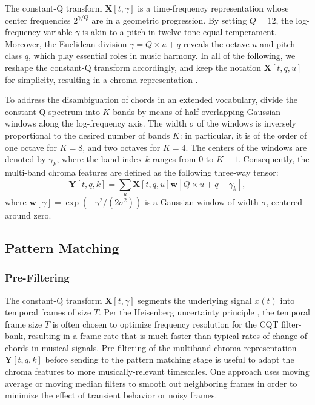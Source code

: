 The constant-Q transform $\mathbf{X}[t, \gamma]$ is a time-frequency
representation whose center frequencies $2^{\gamma/Q}$ are in a geometric progression.
By setting $Q=12$, the log-frequency variable $\gamma$ is akin to a pitch in twelve-tone
equal temperament.
Moreover, the Euclidean division $\gamma = Q \times u + q$
reveals the octave $u$ and pitch class $q$,
which play essential roles in music harmony.
In all of the following, we reshape the constant-Q transform
accordingly, and keep the notation $\mathbf{X}[t, q, u]$ for simplicity, resulting in a chroma representation \cite{cho2014on}.

To address the disambiguation of chords in an extended vocabulary,
\cite{cho2013mirex} divide the constant-Q spectrum into $K$
bands by means of half-overlapping Gaussian windows along
the log-frequency axis.
The width $\sigma$ of the windows is inversely proportional
to the desired number of bands $K$:
in particular, it is of the order of one octave for $K=8$,
and two octaves for $K=4$.
The centers of the windows are denoted by $\gamma_k$, where
the band index $k$ ranges from $0$ to $K-1$.
Consequently, the multi-band chroma features are defined as the following
three-way tensor:
\begin{equation}
\mathbf{Y}[t, q, k]
=
\sum_{u} 
\mathbf{X}[t, q, u]
\boldsymbol{w}[Q \times u + q - \gamma_k],
\end{equation}
where
$\boldsymbol{w}[\gamma] = \exp( - \gamma^2 / (2\sigma^2))$
is a Gaussian window of width $\sigma$, centered around zero.
 
 \subsection{Pattern Matching}
 \label{sec:GMM}
 
 \subsubsection{Pre-Filtering}
 
The constant-Q transform $\mathbf{X}[t,\gamma]$ segments the underlying signal $x(t)$ into temporal frames of size $T$. Per the Heisenberg uncertainty principle \cite{gabor}, the temporal frame size $T$ is often chosen to optimize frequency resolution for the CQT filter-bank, resulting in a frame rate that is much faster than typical rates of change of chords in musical signals. Pre-filtering of the multiband chroma representation $\mathbf{Y}[t,q,k]$ before sending to the pattern matching stage is useful to adapt the chroma features to more musically-relevant timescales. One approach uses moving average \cite{fujishima1999realtime} or moving median \cite{papadopoulos2007large} filters to smooth out neighboring frames in order to minimize the effect of transient behavior or noisy frames.

